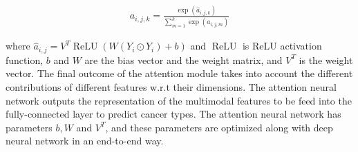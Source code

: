  \vspace{-6mm}
 \begin{align}
    a_{i, j, k}=\frac{\exp \left(\hat{a}_{i, j, k}\right)}{\sum_{m=1}^{k} \exp \left(a_{i, j, m}\right)}
\end{align}

\hspace*{3.5mm} where $\hat{a}_{i,j}=V^{T} \operatorname{ReLU}\left(W\left(Y_{i} \odot Y_{i}\right)+b\right)$ and $\operatorname{ReLU}$ is ReLU activation function, $b$ and $W$ are the bias vector and the weight matrix, and $V^{T}$ is the weight vector. The final outcome of the attention module takes into account the different contributions of different features w.r.t their dimensions. The attention neural network outputs the representation of the multimodal features to be feed into the fully-connected layer to predict cancer types. The attention neural network has parameters $b,W$ and $V^{T}$, and these parameters are optimized along with deep neural network in an end-to-end way.

